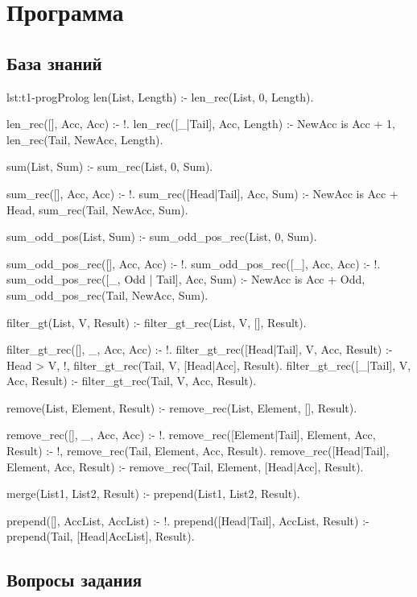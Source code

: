 \section{Программа}

\subsection{База знаний}
\begin{listing}{lst:t1-prog}{Prolog}
len(List, Length) :- 
    len_rec(List, 0, Length).

len_rec([], Acc, Acc) :- !.
len_rec([_|Tail], Acc, Length) :- 
    NewAcc is Acc + 1,
    len_rec(Tail, NewAcc, Length).


sum(List, Sum) :- 
    sum_rec(List, 0, Sum).

sum_rec([], Acc, Acc) :- !.
sum_rec([Head|Tail], Acc, Sum) :- 
    NewAcc is Acc + Head,
    sum_rec(Tail, NewAcc, Sum).


sum_odd_pos(List, Sum) :- 
    sum_odd_pos_rec(List, 0, Sum).

sum_odd_pos_rec([], Acc, Acc) :- !.
sum_odd_pos_rec([_], Acc, Acc) :- !.
sum_odd_pos_rec([_, Odd | Tail], Acc, Sum) :- 
    NewAcc is Acc + Odd,
    sum_odd_pos_rec(Tail, NewAcc, Sum).


filter_gt(List, V, Result) :- 
    filter_gt_rec(List, V, [], Result).

filter_gt_rec([], _, Acc, Acc) :- !.
filter_gt_rec([Head|Tail], V, Acc, Result) :- 
    Head > V, !, 
    filter_gt_rec(Tail, V, [Head|Acc], Result).
filter_gt_rec([_|Tail], V, Acc, Result) :- 
    filter_gt_rec(Tail, V, Acc, Result).


remove(List, Element, Result) :- 
    remove_rec(List, Element, [], Result).

remove_rec([], _, Acc, Acc) :- !.
remove_rec([Element|Tail], Element, Acc, Result) :- !,
    remove_rec(Tail, Element, Acc, Result).
remove_rec([Head|Tail], Element, Acc, Result) :- 
    remove_rec(Tail, Element, [Head|Acc], Result).


merge(List1, List2, Result) :- 
    prepend(List1, List2, Result).

prepend([], AccList, AccList) :- !.
prepend([Head|Tail], AccList, Result) :- 
    prepend(Tail, [Head|AccList], Result).
\end{listing}

\subsection{Вопросы задания}

